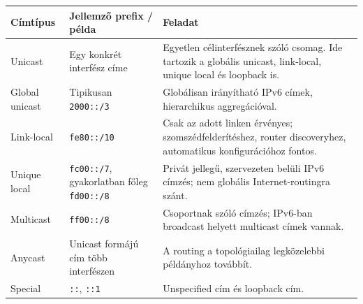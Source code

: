 \begin{tabularx}{\textwidth}{L{31mm}L{34mm}X}
\toprule
\textbf{Címtípus} & \textbf{Jellemző prefix / példa} & \textbf{Feladat} \\
\midrule
Unicast & Egy konkrét interfész címe & Egyetlen célinterfésznek szóló csomag. Ide tartozik a globális unicast, link-local, unique local és loopback is. \\
Global unicast & Tipikusan \texttt{2000::/3} & Globálisan irányítható IPv6 címek, hierarchikus aggregációval. \\
Link-local & \texttt{fe80::/10} & Csak az adott linken érvényes; szomszédfelderítéshez, router discoveryhez, automatikus konfigurációhoz fontos. \\
Unique local & \texttt{fc00::/7}, gyakorlatban főleg \texttt{fd00::/8} & Privát jellegű, szervezeten belüli IPv6 címzés; nem globális Internet-routingra szánt. \\
Multicast & \texttt{ff00::/8} & Csoportnak szóló címzés; IPv6-ban broadcast helyett multicast címek vannak. \\
Anycast & Unicast formájú cím több interfészen & A routing a topológiailag legközelebbi példányhoz továbbít. \\
Special & \texttt{::}, \texttt{::1} & Unspecified cím és loopback cím. \\
\bottomrule
\end{tabularx}
